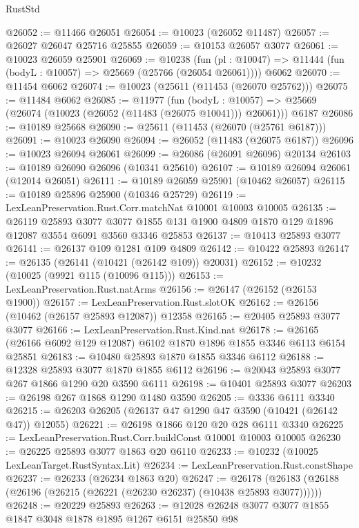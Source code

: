 \begin{lexlean}{RustStd}
\begin{coremodule}
@26052 := @11466 @26051
@26054 := @10023 (@26052 @11487)
@26057 := @26027 @26047 @25716 @25855
@26059 := @10153 @26057 @3077
@26061 := @10023 @26059 @25901
@26069 := @10238
    (fun (pl : @10047) => @11444 (fun (bodyL : @10057) => @25669 (@25766 (@26054 @26061))))
    @6062
@26070 := @11454 @6062
@26074 := @10023 (@25611 (@11453 (@26070 @25762)))
@26075 := @11484 @6062
@26085 := @11977
    (fun (bodyL : @10057) => @25669 (@26074 (@10023 (@26052 (@11483 (@26075 @10041))) @26061)))
    @6187
@26086 := @10189 @25668
@26090 := @25611 (@11453 (@26070 (@25761 @6187)))
@26091 := @10023 @26090
@26094 := @26052 (@11483 (@26075 @6187))
@26096 := @10023 @26094 @26061
@26099 := @26086 (@26091 @26096) @20134
@26103 := @10189 @26090 @26096 (@10341 @25610)
@26107 := @10189 @26094 @26061 (@12014 @26051)
@26111 := @10189 @26059 @25901 (@10462 @26057)
@26115 := @10189 @25896 @25900 (@10346 @25729)
@26119 := LexLeanPreservation.Rust.Corr.matchNat @10001 @10003 @10005
@26135 := @26119
    @25893
    @3077
    @3077
    @1855
    @131
    @1900
    @4809
    @1870
    @129
    @1896
    @12087
    @3554
    @6091
    @3560
    @3346
    @25853
@26137 := @10413 @25893 @3077
@26141 := @26137 @109 @1281 @109 @4809
@26142 := @10422 @25893
@26147 := @26135 (@26141 (@10421 (@26142 @109)) @20031)
@26152 := @10232 (@10025 (@9921 @115 (@10096 @115)))
@26153 := LexLeanPreservation.Rust.natArms
@26156 := @26147 (@26152 (@26153 @1900))
@26157 := LexLeanPreservation.Rust.slotOK
@26162 := @26156 (@10462 (@26157 @25893 @12087)) @12358
@26165 := @20405 @25893 @3077 @3077
@26166 := LexLeanPreservation.Rust.Kind.nat
@26178 := @26165 (@26166 @6092 @129 @12087) @6102 @1870 @1896 @1855 @3346 @6113 @6154 @25851
@26183 := @10480 @25893 @1870 @1855 @3346 @6112
@26188 := @12328 @25893 @3077 @1870 @1855 @6112
@26196 := @20043 @25893 @3077 @267 @1866 @1290 @20 @3590 @6111
@26198 := @10401 @25893 @3077
@26203 := @26198 @267 @1868 @1290 @1480 @3590
@26205 := @3336 @6111 @3340
@26215 := @26203 @26205 (@26137 @47 @1290 @47 @3590 (@10421 (@26142 @47)) @12055)
@26221 := @26198 @1866 @120 @20 @28 @6111 @3340
@26225 := LexLeanPreservation.Rust.Corr.buildConst @10001 @10003 @10005
@26230 := @26225 @25893 @3077 @1863 @20 @6110
@26233 := @10232 (@10025 LexLeanTarget.RustSyntax.Lit)
@26234 := LexLeanPreservation.Rust.constShape
@26237 := @26233 (@26234 @1863 @20)
@26247 := @26178 (@26183 (@26188 (@26196 (@26215 (@26221 (@26230 @26237) (@10438 @25893 @3077))))))
@26248 := @20229 @25893
@26263 := @12028
    @26248
    @3077
    @3077
    @1855
    @1847
    @3048
    @1878
    @1895
    @1267
    @6151
    @25850
    @98

\end{coremodule}
\end{lexlean}
